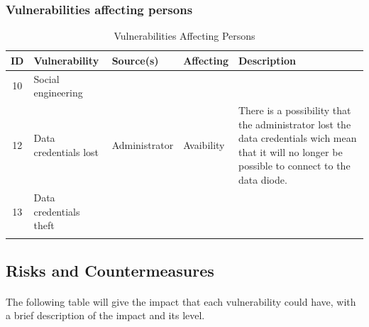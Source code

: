 \documentclass[a4paper,10pt]{article}
\begin{document}
\subsubsection{Vulnerabilities affecting persons}
\begin{longtable}{|c|p{2.5cm}|p{2.5cm}|p{2.5cm}|p{6.5cm}|}
\hline
\textbf{ID}&  \textbf{Vulnerability} & \textbf{Source(s)} & \textbf{Affecting} & \textbf{Description} \\
\hline
10 & Social engineering &  &  & \\
\hline
12 & Data credentials lost & Administrator & Avaibility  & There is a possibility that the administrator lost the data credentials wich mean that it will no longer be possible to connect to the data diode. \\
\hline
13 & Data credentials theft &  &  & \\
\hline
\caption{Vulnerabilities Affecting Persons}
\label{tab:person-assets}
\end{longtable}

\subsection{Risks and Countermeasures}

\paragraph{} The following table will give the impact that each vulnerability could have, with a brief description of the impact and its level.
\end{document}
